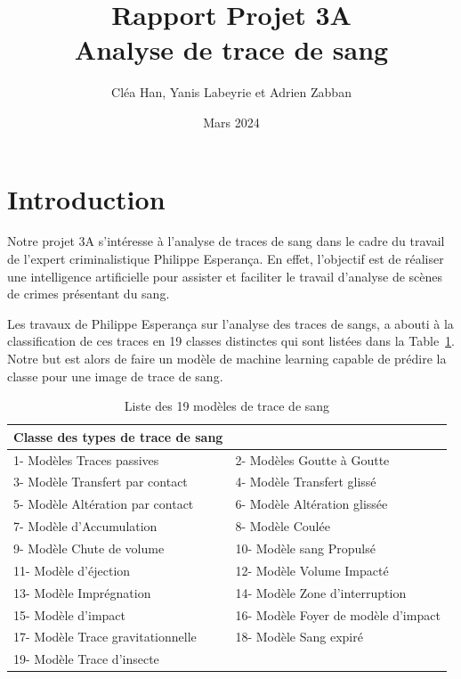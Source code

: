 \documentclass[a4paper]{article}
\title{Rapport Projet 3A \\ Analyse de trace de sang}
\author{Cléa Han, Yanis Labeyrie et Adrien Zabban}
\date{Mars 2024}
\begin{document}
\maketitle

\section{Introduction}

Notre projet 3A s'intéresse à l'analyse de traces de sang dans le cadre du travail de l'expert criminalistique Philippe Esperança. En effet, l'objectif est de réaliser une intelligence artificielle pour assister et faciliter le travail d'analyse de scènes de crimes présentant du sang. 

Les travaux de Philippe Esperança sur l'analyse des traces de sangs, a abouti à la classification de ces traces en 19 classes distinctes qui sont listées dans la Table~\ref{tab:classes}. Notre but est alors de faire un modèle de machine learning capable de prédire la classe pour une image de trace de sang.

\begin{table}[ht]
    \centering
    \begin{tabular}{|ll|}
        \hline
        \textbf{Classe des types de trace de sang} &  \\
        \hline
        1- Modèles Traces passives & 2- Modèles Goutte à Goutte \\
        3- Modèle Transfert par contact & 4- Modèle Transfert glissé \\
        5- Modèle Altération par contact & 6- Modèle Altération glissée \\
        7- Modèle d'Accumulation & 8- Modèle Coulée \\
        9- Modèle Chute de volume & 10- Modèle sang Propulsé \\
        11- Modèle d'éjection & 12- Modèle Volume Impacté \\
        13- Modèle Imprégnation & 14- Modèle Zone d'interruption \\
        15- Modèle d'impact & 16- Modèle Foyer de modèle d'impact \\
        17- Modèle Trace gravitationnelle & 18- Modèle Sang expiré \\
        19- Modèle Trace d'insecte & \\
        \hline
    \end{tabular}
    \caption{Liste des 19 modèles de trace de sang}
    \label{tab:classes}
\end{table}
\end{document}
